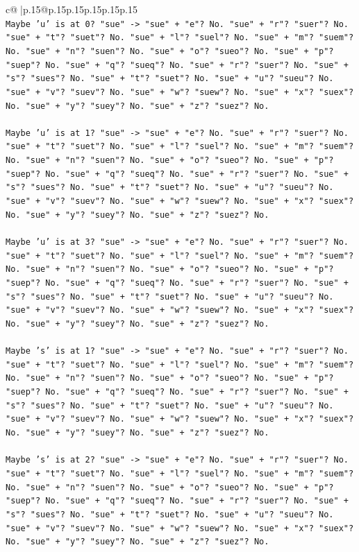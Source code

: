 \documentclass{article}
\begin{document}
{\begin{supertabular}{c@{$\;$}|p{.15\linewidth}@{}p{.15\linewidth}p{.15\linewidth}p{.15\linewidth}p{.15\linewidth}p{.15\linewidth}}
{{{\\ 
\texttt{Maybe 'u' is at 0? "sue" {-}> "sue" + "e"? No. "sue" + "r"? "suer"? No. "sue" + "t"? "suet"? No. "sue" + "l"? "suel"? No. "sue" + "m"? "suem"? No. "sue" + "n"? "suen"? No. "sue" + "o"? "sueo"? No. "sue" + "p"? "suep"? No. "sue" + "q"? "sueq"? No. "sue" + "r"? "suer"? No. "sue" + "s"? "sues"? No. "sue" + "t"? "suet"? No. "sue" + "u"? "sueu"? No. "sue" + "v"? "suev"? No. "sue" + "w"? "suew"? No. "sue" + "x"? "suex"? No. "sue" + "y"? "suey"? No. "sue" + "z"? "suez"? No.} \\
\\ 
\texttt{Maybe 'u' is at 1? "sue" {-}> "sue" + "e"? No. "sue" + "r"? "suer"? No. "sue" + "t"? "suet"? No. "sue" + "l"? "suel"? No. "sue" + "m"? "suem"? No. "sue" + "n"? "suen"? No. "sue" + "o"? "sueo"? No. "sue" + "p"? "suep"? No. "sue" + "q"? "sueq"? No. "sue" + "r"? "suer"? No. "sue" + "s"? "sues"? No. "sue" + "t"? "suet"? No. "sue" + "u"? "sueu"? No. "sue" + "v"? "suev"? No. "sue" + "w"? "suew"? No. "sue" + "x"? "suex"? No. "sue" + "y"? "suey"? No. "sue" + "z"? "suez"? No.} \\
\\ 
\texttt{Maybe 'u' is at 3? "sue" {-}> "sue" + "e"? No. "sue" + "r"? "suer"? No. "sue" + "t"? "suet"? No. "sue" + "l"? "suel"? No. "sue" + "m"? "suem"? No. "sue" + "n"? "suen"? No. "sue" + "o"? "sueo"? No. "sue" + "p"? "suep"? No. "sue" + "q"? "sueq"? No. "sue" + "r"? "suer"? No. "sue" + "s"? "sues"? No. "sue" + "t"? "suet"? No. "sue" + "u"? "sueu"? No. "sue" + "v"? "suev"? No. "sue" + "w"? "suew"? No. "sue" + "x"? "suex"? No. "sue" + "y"? "suey"? No. "sue" + "z"? "suez"? No.} \\
\\ 
\texttt{Maybe 's' is at 1? "sue" {-}> "sue" + "e"? No. "sue" + "r"? "suer"? No. "sue" + "t"? "suet"? No. "sue" + "l"? "suel"? No. "sue" + "m"? "suem"? No. "sue" + "n"? "suen"? No. "sue" + "o"? "sueo"? No. "sue" + "p"? "suep"? No. "sue" + "q"? "sueq"? No. "sue" + "r"? "suer"? No. "sue" + "s"? "sues"? No. "sue" + "t"? "suet"? No. "sue" + "u"? "sueu"? No. "sue" + "v"? "suev"? No. "sue" + "w"? "suew"? No. "sue" + "x"? "suex"? No. "sue" + "y"? "suey"? No. "sue" + "z"? "suez"? No.} \\
\\ 
\texttt{Maybe 's' is at 2? "sue" {-}> "sue" + "e"? No. "sue" + "r"? "suer"? No. "sue" + "t"? "suet"? No. "sue" + "l"? "suel"? No. "sue" + "m"? "suem"? No. "sue" + "n"? "suen"? No. "sue" + "o"? "sueo"? No. "sue" + "p"? "suep"? No. "sue" + "q"? "sueq"? No. "sue" + "r"? "suer"? No. "sue" + "s"? "sues"? No. "sue" + "t"? "suet"? No. "sue" + "u"? "sueu"? No. "sue" + "v"? "suev"? No. "sue" + "w"? "suew"? No. "sue" + "x"? "suex"? No. "sue" + "y"? "suey"? No. "sue" + "z"? "suez"? No.} \\
}}}
\end{supertabular}}
\end{document}
